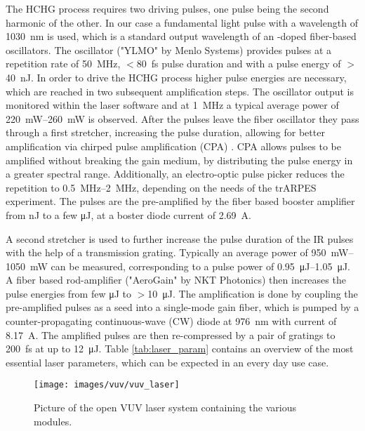 The HCHG process requires two driving pulses, one pulse being the second harmonic of the other.
In our case a fundamental light pulse with a wavelength of \qty{1030}{\nano\meter} is used, which is a standard output wavelength of an -doped fiber-based oscillators.
The oscillator ("YLMO" by Menlo Systems) provides pulses at a repetition rate of \qty{50}{\mega\hertz}, $<$\qty{80}{\femto\second} pulse duration and with a pulse energy of $>$\qty{40}{\nano\joule}.
In order to drive the HCHG process higher pulse energies are necessary, which are reached in two subsequent amplification steps.
The oscillator output is monitored within the laser software and at \qty{1}{\mega\hertz} a typical average power of \qtyrange{220}{260}{\milli\watt} is observed.
After the pulses leave the fiber oscillator they pass through a first stretcher, increasing the pulse duration, allowing for better amplification via chirped pulse amplification (CPA) \cite{strickland_compression_1985,maine_generation_1988,strickland_chirped_2021}.
CPA allows pulses to be amplified without breaking the gain medium, by distributing the pulse energy in a greater spectral range. Additionally, an electro-optic pulse picker reduces the repetition to \qtyrange{0.5}{2}{\mega\hertz}, depending on the needs of the trARPES experiment.
The pulses are the pre-amplified by the fiber based booster amplifier from \unit{\nano\joule} to a few \unit{\micro\joule}, at a boster diode current of \qty{2.69}{\ampere}.

A second stretcher is used to further increase the pulse duration of the IR pulses with the help of a transmission grating.
Typically an average power of \qtyrange{950}{1050}{\milli\watt} can be measured, corresponding to a pulse power of \qtyrange{0.95}{1.05}{\micro\joule}.
A fiber based rod-amplifier ("AeroGain" by NKT Photonics) then increases the pulse energies from few \unit{\micro\joule} to $>$\qty{10}{\micro\joule}.
The amplification is done by coupling the pre-amplified pulses as a seed into a single-mode gain fiber, which is pumped by a counter-propagating continuous-wave (CW) diode at \qty{976}{\nano\meter} with current of \qty{8.17}{\ampere}.
The amplified pulses are then re-compressed by a pair of gratings to \qty{200}{\femto\second} at up to \qty{12}{\micro\joule}.
Table \ref{tab:laser_param} contains an overview of the most essential laser parameters, which can be expected in an every day use case.

\begin{figure}
	\centering
	\texttt{[image: images/vuv/vuv\_laser]}
	\caption{Picture of the open VUV laser system containing the various modules.}
	\label{fig:vuvlaser}
\end{figure}


